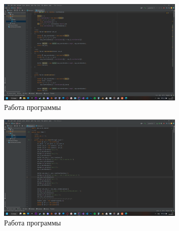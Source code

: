 \documentclass[a4paper, 14pt]{extarticle}
\begin{document}
\begin{figure}[!htb]
	\centering
	\includegraphics[width=0.8\textwidth]{picture_2.png}
\caption{Работа программы}
\label{fig:picture_2.png}
\end{figure}

\begin{figure}[!htb]
	\centering
	\includegraphics[width=0.8\textwidth]{picture_3.png}
\caption{Работа программы}
\label{fig:picture_3.png}
\end{figure}
\end{document}
